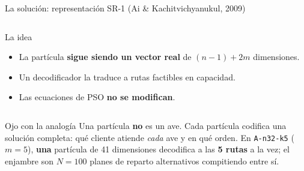 \documentclass[aspectratio=169, 11pt, xcolor={dvipsnames,table}]{beamer}
\newcommand{\azul}[1]{\textcolor{UsachAzul}{#1}}
\newcommand{\naranja}[1]{\textcolor{UsachNaranja}{#1}}
\begin{document}
\begin{frame}{La solución: representación SR-1 \footnotesize (Ai \& Kachitvichyanukul, 2009)}
\begin{columns}[c]
\begin{exampleblock}{La idea}
\footnotesize
\begin{itemize}\setlength\itemsep{4pt}
  \item La partícula \textbf{sigue siendo un vector real} de $(n-1)+2m$ dimensiones.
  \item Un \azul{decodificador} la traduce a rutas factibles en capacidad.
  \item Las ecuaciones de PSO \textbf{no se modifican}.
\end{itemize}
\end{exampleblock}
\centering
{}
\end{columns}
\vspace{4pt}
\begin{alertblock}{Ojo con la analogía}
\scriptsize
Una partícula \textbf{no} es un ave. Cada partícula codifica \azul{una solución completa}: qué
cliente atiende \emph{cada} ave y en qué orden. En \texttt{A-n32-k5} ($m{=}5$), \textbf{una}
partícula de 41 dimensiones decodifica a las \textbf{5 rutas} a la vez; el enjambre son
$N{=}100$ \naranja{planes de reparto alternativos} compitiendo entre sí.
\end{alertblock}
\end{frame}
\end{document}
